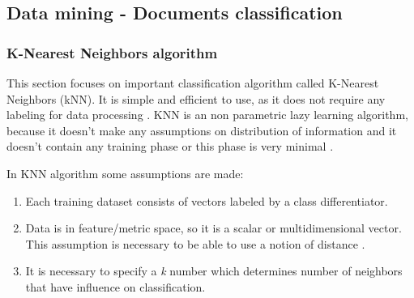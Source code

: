 \subsection{Data mining - Documents classification} \label{soa-classification}
	\subsubsection{K-Nearest Neighbors algorithm} \label{soa-knn}
	This section focuses on important classification algorithm called K-Nearest Neighbors (kNN). It is simple and efficient to use, as it does not require any labeling for data processing \cite{knn}. KNN is an non parametric lazy learning algorithm, because it doesn't make any assumptions on distribution of information and it doesn't contain any training phase or this phase is very minimal \cite{knn2}.  
	
	In KNN algorithm some assumptions are made:
	\begin{enumerate}
		\item Each training dataset consists of vectors labeled by a class differentiator. 
		\item Data is in feature/metric space, so it is a scalar or multidimensional vector. This assumption is necessary to be able to use a notion of distance \cite{knn2}.
		\item It is necessary to specify a \textit{k} number which determines number of neighbors that have influence on classification. 
	\end{enumerate}
	

